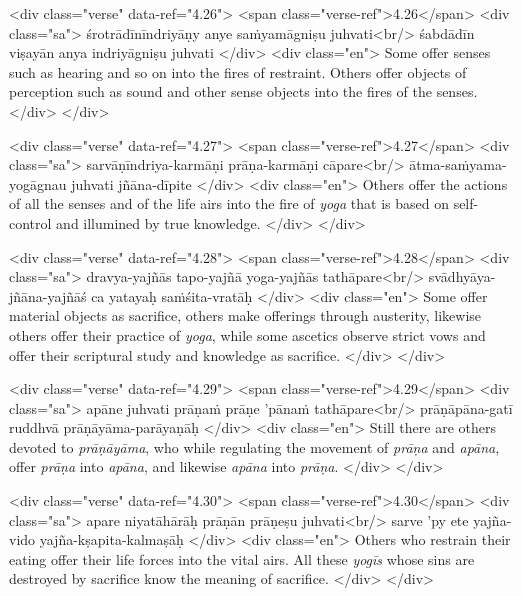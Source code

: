 \begin{html}
<div class="verse" data-ref="4.26">
  <span class="verse-ref">4.26</span>
  <div class="sa">
    śrotrādīnīndriyāṇy anye saṁyamāgniṣu juhvati<br/>
    śabdādīn viṣayān anya indriyāgniṣu juhvati
  </div>
  <div class="en">
    Some offer senses such as hearing and so on into the fires of restraint. Others offer objects of perception such as sound and other sense objects into the fires of the senses.
  </div>
</div>
\end{html}



\begin{html}
<div class="verse" data-ref="4.27">
  <span class="verse-ref">4.27</span>
  <div class="sa">
    sarvāṇīndriya-karmāṇi prāṇa-karmāṇi cāpare<br/>
    ātma-saṁyama-yogāgnau juhvati jñāna-dīpite
  </div>
  <div class="en">
    Others offer the actions of all the senses and of the life airs into the fire of \textit{yoga} that is based on self-control and illumined by true knowledge.
  </div>
</div>
\end{html}



\begin{html}
<div class="verse" data-ref="4.28">
  <span class="verse-ref">4.28</span>
  <div class="sa">
    dravya-yajñās tapo-yajñā yoga-yajñās tathāpare<br/>
    svādhyāya-jñāna-yajñāś ca yatayaḥ saṁśita-vratāḥ
  </div>
  <div class="en">
    Some offer material objects as sacrifice, others make offerings through austerity, likewise others offer their practice of \textit{yoga}, while some ascetics observe strict vows and offer their scriptural study and knowledge as sacrifice.
  </div>
</div>
\end{html}



\begin{html}
<div class="verse" data-ref="4.29">
  <span class="verse-ref">4.29</span>
  <div class="sa">
    apāne juhvati prāṇaṁ prāṇe ’pānaṁ tathāpare<br/>
    prāṇāpāna-gatī ruddhvā prāṇāyāma-parāyaṇāḥ
  </div>
  <div class="en">
    Still there are others devoted to \textit{prāṇāyāma}, who while regulating the movement of \textit{prāṇa} and \textit{apāna}, offer \textit{prāṇa} into \textit{apāna}, and likewise \textit{apāna} into \textit{prāṇa}.
  </div>
</div>
\end{html}



\begin{html}
<div class="verse" data-ref="4.30">
  <span class="verse-ref">4.30</span>
  <div class="sa">
    apare niyatāhārāḥ prāṇān prāṇeṣu juhvati<br/>
    sarve ’py ete yajña-vido yajña-kṣapita-kalmaṣāḥ
  </div>
  <div class="en">
    Others who restrain their eating offer their life forces into the vital airs. All these \textit{yogīs} whose sins are destroyed by sacrifice know the meaning of sacrifice.
  </div>
</div>
\end{html}



